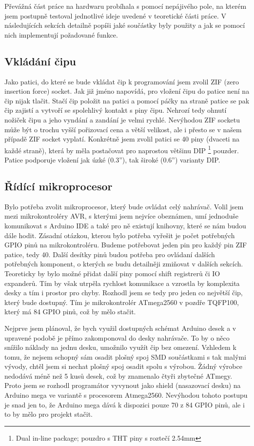 \documentclass[11pt,a4paper,twoside,openright]{report}
\begin{document}
Převážná část práce na hardwaru probíhala s pomocí nepájivého pole, na kterém jsem postupně testoval jednotlivé ideje uvedené v teoretické části práce. V následujících sekcích detailně popíši jaké součástky byly použity a jak se pomocí nich implementují požadované funkce.

\subsection {Vkládání čipu}

Jako patici, do které se bude vkládat čip k programování jsem zvolil ZIF (zero insertion force) socket. Jak již jméno napovídá, pro vložení čipu do patice není na čip nijak tlačit. Stačí čip položit na patici a pomocí páčky na straně patice se pak čip zajistí a vytvoří se spolehlivý kontakt s piny čipu. Nehrozí tedy ohnutí nožiček čipu a jeho vyndání a zandání je velmi rychlé. Nevýhodou ZIF socketu může být o trochu vyšší pořizovací cena a větší velikost, ale i přesto se v našem případě ZIF socket vyplatí. Konkrétně jsem zvolil patici se 40 piny (dvaceti na každé straně), která by měla postačovat pro naprostou většinu DIP \footnote{Dual in-line package; pouzdro s THT piny s roztečí 2.54mm} pouzder. Patice podporuje vložení jak úzké (0.3''), tak široké (0.6'') varianty DIP.

\subsection {Řídící mikroprocesor}

Bylo potřeba zvolit mikroprocesor, který bude ovládat celý nahrávač. Volil jsem mezi mikrokontroléry AVR, s kterými jsem nejvíce obeznámen, umí jednoduše komunikovat s Arduino IDE a také pro ně existují knihovny, které se nám budou dále hodit. Zásadní otázkou, kterou bylo potřeba vyřešit je počet potřebných GPIO pinů na mikrokontroléru. Budeme potřebovat jeden pin pro každý pin ZIF patice, tedy 40. Další desítky pinů budou potřeba pro ovládaní dalších potřebných komponent, o kterých se budu detailněji zmiňovat v dalších sekcích. Teoreticky by bylo možné přidat další piny pomocí shift registrerů či IO expanderů. Tím by však utrpěla rychlost komunikace a vzrostla by komplexita desky a tím i prostor pro chyby. Rozhodl jsem se tedy pro jeden co největší čip, který bude dostupný. Tím je mikrokontrolér ATmega2560 v pozdře TQFP100, který má 84 GPIO pinů, což by mělo stačit.\cite{atmega2560} 

Nejprve jsem plánoval, že bych využil dostupných schémat Arduino desek a v upravené podobě je přímo zakomponoval do desky nahrávače. To by o něco snížilo náklady na jednu desku, umožnilo využít čip bez omezení. Vzhledem k tomu, že nejsem schopný sám osadit plošný spoj SMD součástkami s tak malými vývody, chtěl jsem si nechat plošný spoj osadit spolu s výrobou. Žádný výrobce nedodává méně než 5 kusů desek, což by znamenalo čtyři zbytečné ATmegy. Proto jsem se rozhodl programátor vyvynout jako shield (nasazovací desku) na Arduino mega ve variantě s procesorem Atmega2560. Nevýhodou tohoto postupu je snad jen to, že Arduino mega dává k dispozici pouze 70 z 84 GPIO pinů, ale i to by mělo pro projekt stačit.\cite{ArduinoMega}
\end{document}
